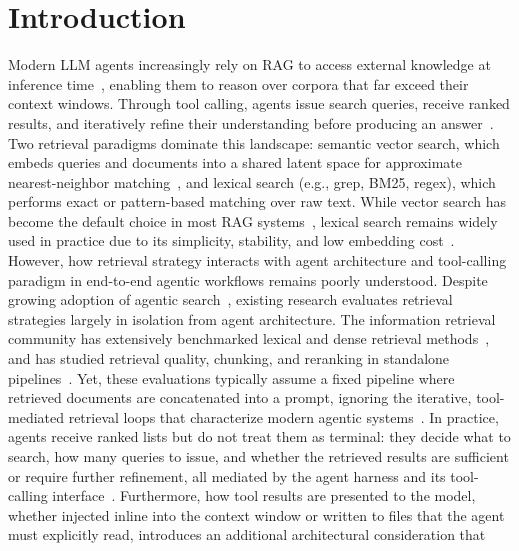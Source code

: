 \documentclass[sigconf,nonacm]{acmart}
\begin{document}
\section{Introduction}
  \label{sec:intro}
  Modern LLM agents increasingly rely on RAG to access external knowledge at inference time~\cite{lewis2020rag,gao2024ragsurvey}, enabling them to reason over corpora that far exceed their context windows. Through tool calling, agents issue search queries, receive ranked results, and iteratively refine their understanding before producing an answer~\cite{yao2023react,schick2023toolformer,qin2023toolsurvey}. Two retrieval paradigms dominate this landscape: semantic vector search, which embeds queries and documents into a shared latent space for approximate nearest-neighbor matching~\cite{karpukhin2020dpr}, and lexical search (e.g., grep, BM25, regex), which performs exact or pattern-based matching over raw text. While vector search has become the default choice in most RAG systems~\cite{gao2024ragsurvey,wang2024ragbestpractices}, lexical search remains widely used in practice due to its simplicity, stability, and low embedding cost~\cite{lin2019neuralhype,thakur2021beir}. However, how retrieval strategy interacts with agent architecture and tool-calling paradigm in end-to-end agentic workflows remains poorly understood.
  Despite growing adoption of agentic search~\cite{asai2024selfrag,jiang2023flare,trivedi2023ircot}, existing research evaluates retrieval strategies largely in isolation from agent architecture. The information retrieval community has extensively benchmarked lexical and dense retrieval
  methods~\cite{thakur2021beir,luan2021sparse,formal2021splade}, and has studied retrieval quality, chunking, and reranking in standalone
  pipelines~\cite{gao2024ragsurvey,wang2024ragbestpractices}. Yet, these evaluations typically assume a fixed pipeline where retrieved documents are concatenated into a prompt, ignoring the iterative, tool-mediated retrieval loops that characterize modern agentic
  systems~\cite{qin2023toolllm,patil2023gorilla}. In practice, agents receive ranked lists but do not treat them as terminal: they decide what to search, how many queries to issue, and whether the retrieved results are sufficient or require further refinement, all mediated by the agent harness and its tool-calling interface~\cite{sumers2023coala,wang2023agentsurvey}. Furthermore, how tool results are
  presented to the model, whether injected inline into the context window or written to files
  that the agent must explicitly read, introduces an additional architectural consideration that
\end{document}
